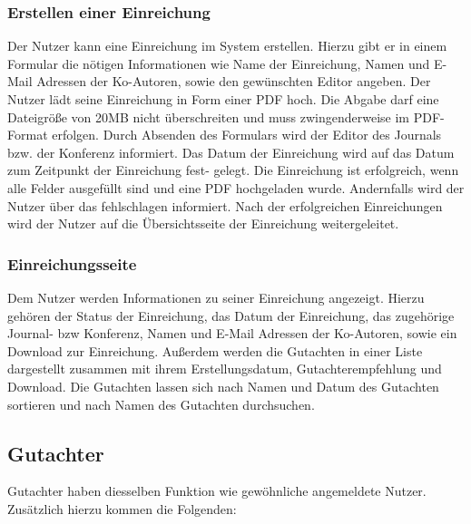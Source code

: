 \subsubsection{Erstellen einer Einreichung}
\begin{description}
    \XXitem{}{} Der Nutzer kann eine Einreichung im System erstellen. Hierzu gibt er in einem
    Formular die nötigen Informationen wie Name der Einreichung, Namen und E-Mail Adressen der Ko-Autoren,
    sowie den gewünschten Editor angeben.
    \XXitem{}{} Der Nutzer lädt seine Einreichung in Form einer PDF hoch. Die Abgabe darf eine Dateigröße
    von 20MB nicht überschreiten und muss zwingenderweise im PDF-Format erfolgen.
    \XXitem{}{} Durch Absenden des Formulars wird der Editor des Journals bzw. der Konferenz
    informiert. Das Datum der Einreichung wird auf das Datum zum Zeitpunkt der Einreichung fest-
    gelegt.
    \XXitem{}{} Die Einreichung ist erfolgreich, wenn alle Felder ausgefüllt sind und eine PDF
    hochgeladen wurde. Andernfalls wird der Nutzer über das fehlschlagen informiert.
    \XXitem{}{} Nach der erfolgreichen Einreichungen wird der Nutzer auf die Übersichtsseite der
    Einreichung weitergeleitet.
\end{description}

\subsubsection{Einreichungsseite}
\begin{description}
     Dem Nutzer werden Informationen zu seiner Einreichung angezeigt.
    Hierzu gehören der Status der Einreichung, das Datum der Einreichung, das zugehörige
    Journal- bzw Konferenz, Namen und E-Mail Adressen der Ko-Autoren, sowie ein Download zur Einreichung.
    \XXitem{}{} Außerdem werden die Gutachten in einer
    Liste dargestellt zusammen mit ihrem Erstellungsdatum, Gutachterempfehlung und Download. %
    \XXitem{}{} Die Gutachten lassen sich nach Namen und Datum
    des Gutachten sortieren und nach Namen des Gutachten durchsuchen. %
\end{description}

\subsection{Gutachter}
Gutachter haben diesselben Funktion wie gewöhnliche angemeldete Nutzer. Zusätzlich hierzu kommen
die Folgenden:

